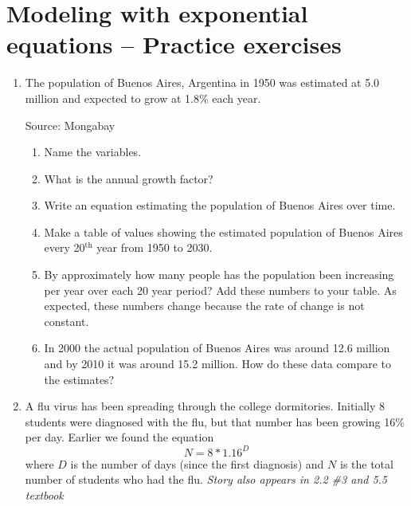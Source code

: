 
\section{Modeling with exponential equations -- Practice exercises}

\begin{enumerate}
\item The population of Buenos Aires, Argentina in 1950 was estimated at 5.0 million and expected to grow at 1.8\% each year.  \hfill \begin{footnotesize} Source: Mongabay \end{footnotesize}
\begin{enumerate}
\item Name the variables. \vfill
\item What is the annual growth factor? \vfill
\item Write an equation estimating the population of Buenos Aires over time. \vfill
\item Make a table of values showing the estimated population of Buenos Aires every 20$^{\text{th}}$ year from 1950 to 2030. \vfill \vfill \vfill
\item By approximately how many people has the population been increasing per year over each 20 year period? Add these numbers to your table. As expected, these numbers change because the rate of change is not constant.
\item In 2000 the actual population of Buenos Aires was around 12.6 million and by 2010 it was around 15.2 million.  How do these data compare to the estimates? \vfill
\end{enumerate} 

\newpage %

\item A flu virus has been spreading through the college dormitories. Initially 8 students were diagnosed with the flu, but that number has been growing 16\% per day.   Earlier we found the equation $$N=8 \ast1.16^D$$ where $D$ is the number of days (since the first diagnosis) and $N$ is the total number of students who had the flu.   \hfill  \emph{Story also appears in 2.2 \#3 and 5.5 textbook}


\end{enumerate}
